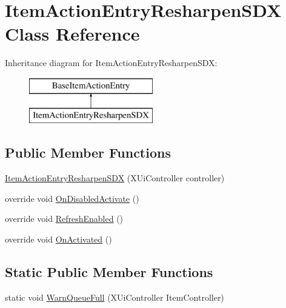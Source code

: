 \hypertarget{class_item_action_entry_resharpen_s_d_x}{}\section{Item\+Action\+Entry\+Resharpen\+S\+DX Class Reference}
\label{class_item_action_entry_resharpen_s_d_x}
Inheritance diagram for Item\+Action\+Entry\+Resharpen\+S\+DX\+:\begin{figure}[H]
\begin{center}
\leavevmode
\includegraphics[height=2.000000cm]{d7/dae/class_item_action_entry_resharpen_s_d_x}
\end{center}
\end{figure}
\subsection*{Public Member Functions}
\begin{DoxyCompactItemize}
\item 
\mbox{\hyperlink{class_item_action_entry_resharpen_s_d_x_ac0907b467043c8677f1f4e520cb5015f}{Item\+Action\+Entry\+Resharpen\+S\+DX}} (X\+Ui\+Controller controller)
\item 
override void \mbox{\hyperlink{class_item_action_entry_resharpen_s_d_x_aaceea0c8f316332271b4c72bcaf5619b}{On\+Disabled\+Activate}} ()
\item 
override void \mbox{\hyperlink{class_item_action_entry_resharpen_s_d_x_a524f80b83cfc9eb840aa654215f3ed1b}{Refresh\+Enabled}} ()
\item 
override void \mbox{\hyperlink{class_item_action_entry_resharpen_s_d_x_a00ee6e81481137ca604764d88963df02}{On\+Activated}} ()
\end{DoxyCompactItemize}
\subsection*{Static Public Member Functions}
\begin{DoxyCompactItemize}
\item 
static void \mbox{\hyperlink{class_item_action_entry_resharpen_s_d_x_af7e651fba91d1e3b636b748e658f63e7}{Warn\+Queue\+Full}} (X\+Ui\+Controller Item\+Controller)
\end{DoxyCompactItemize}



